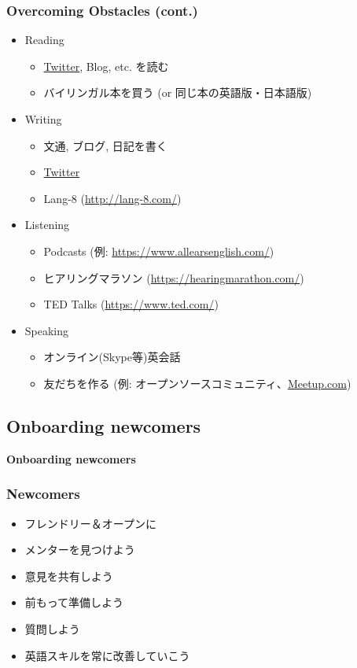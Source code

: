 \documentclass[aspectratio=169,11pt,hyperref={colorlinks=true}]{beamer}
\begin{document}
\begin{frame}
\frametitle{Overcoming Obstacles (cont.)}
  \begin{itemize}
  \item[] Reading
    \begin{itemize}
    \item \href{https://twitter.com}{Twitter}, Blog, etc. を読む
    \item バイリンガル本を買う (or 同じ本の英語版・日本語版)
    \end{itemize}
  \item[] Writing
    \begin{itemize}
    \item 文通, ブログ, 日記を書く
    \item \href{https://twitter.com}{Twitter}
    \item Lang-8 (\url{http://lang-8.com/})
    \end{itemize}
  \item[] Listening
    \begin{itemize}
    \item Podcasts (例: \url{https://www.allearsenglish.com/})
    \item ヒアリングマラソン (\url{https://hearingmarathon.com/})
    \item TED Talks (\url{https://www.ted.com/})
    \end{itemize}
  \item[] Speaking
    \begin{itemize}
    \item オンライン(Skype等)英会話
    \item 友だちを作る (例: オープンソースコミュニティ、\href{https://www.meetup.com/meetup-group-en-jp/}{Meetup.com})
    \end{itemize}
  \end{itemize}
\end{frame}


\subsection{Onboarding newcomers}
\begin{frame}
  \bf\Huge{Onboarding newcomers}
\end{frame}

\begin{frame}
\frametitle{Newcomers}
  \begin{itemize}
  \item フレンドリー＆オープンに
  \item メンターを見つけよう
  \item 意見を共有しよう
  \item 前もって準備しよう
  \item 質問しよう
  \item 英語スキルを常に改善していこう
  \end{itemize}
\end{frame}
\end{document}

